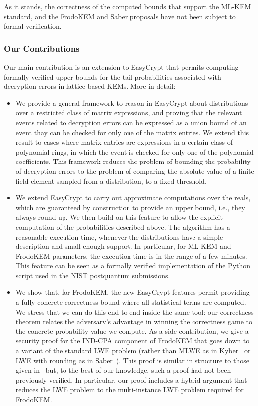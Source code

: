 \documentclass[conference,compsoc]{IEEEtran}
\begin{document}
As it stands, the correctness of the computed bounds that support the ML-KEM standard, and the FrodoKEM and Saber proposals have not been subject to formal verification. 

\subsubsection*{Our Contributions}
Our main contribution is an extension to EasyCrypt that permits computing formally verified upper bounds for the tail probabilities associated with decryption errors in lattice-based KEMs.
More in detail:
\begin{itemize}[leftmargin=*]
  \item We provide a general framework to reason in EasyCrypt about distributions over a restricted class of matrix expressions, and proving that the relevant events related to decryption errors can be expressed as a union bound of an event thay can be checked for only one of the matrix entries. We extend this result to cases where matrix entries are expressions in a certain class of polynomial rings, in which the event is checked for only one of the polynomial coefficients. This framework reduces the problem of bounding the probability of decryption errors to the problem of comparing the absolute value of a finite field element sampled from a distribution, to a fixed threshold.
  \item We extend EasyCrypt to carry out approximate computations over the reals, which are guaranteed by construction to provide an upper bound, i.e., they always round up. We then build on this feature to allow the explicit computation of the probabilities described above. The algorithm has a reasonable execution time, whenever the distributions have a simple description and small enough support. In particular, for ML-KEM and FrodoKEM parameters, the execution time is in the range of a few minutes. This feature can be seen as a formally verified implementation of the Python script used in the NIST postquantum submissions.
  \item We show that, for FrodoKEM, the new EasyCrypt features permit providing a fully concrete correctness bound where all statistical terms are computed. We stress that we can do this end-to-end inside the same tool: our correctness theorem relates the adversary's advantage in winning the correctness game to the concrete probability value we compute. As a side contribution, we give a security proof for the IND-CPA component of FrodoKEM that goes down to a variant of the standard LWE problem (rather than MLWE as in Kyber~\cite{} or LWE with rounding as in Saber~\cite{}). This proof is similar in structure to those given in~\cite{} but, to the best of our knowledge, such a proof had not been previously verified. In particular, our proof includes a hybrid argument that reduces the LWE problem to the multi-instance LWE problem required for FrodoKEM.

\end{itemize}
\end{document}
